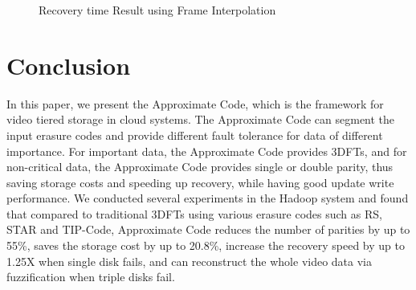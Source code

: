\documentclass[sigconf]{acmart}
\begin{document}
\begin{figure}[ht]
\centering
{}\hspace{-0.4cm}
\caption{Recovery time Result using Frame Interpolation}
\label{fig-recoverytime}
\end{figure}

\section{Conclusion}\label{Conclusion}
In this paper, we present the Approximate Code, which is the framework for video tiered storage in cloud systems. The Approximate Code can segment the input erasure codes and provide different fault tolerance for data of different importance. For important data, the Approximate Code provides 3DFTs, and for non-critical data, the Approximate Code provides single or double parity, thus saving storage costs and speeding up recovery, while having good update write performance. We conducted several experiments in the Hadoop system and found that compared to traditional 3DFTs using various erasure codes such as RS, STAR and TIP-Code, Approximate Code reduces the number of parities by up to 55\%, saves the storage cost by up to 20.8\%, increase the recovery speed by up to 1.25X when single disk fails, and can reconstruct the whole video data via fuzzification when triple disks fail.



\end{document}
